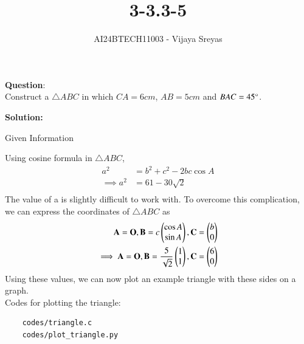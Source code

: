 \documentclass[journal]{IEEEtran}
\begin{document}

\vspace{3cm}

\title{3-3.3-5}
\author{AI24BTECH11003 - Vijaya Sreyas
}
{\let\newpage\relax\maketitle}

\renewcommand{\thefigure}{\theenumi}
\renewcommand{\thetable}{\theenumi}
\setlength{\intextsep}{10pt} %


\renewcommand{\thetable}{\theenumi}


\textbf{Question}:\\
Construct a $\triangle ABC$ in which $CA = 6cm$, $AB = 5cm$ and $BAC = 45\degree$.

\textbf{Solution: }

\begin{table}[h!]    
  \centering
  
  \caption{Given Information}
  \label{3-3.3-5-tab-0}
\end{table}

Using cosine formula in $\triangle ABC$, 
\begin{align}
	a^2 &= b^2 + c^2 - 2bc\cos A \\
	\implies a^2 &= 61 - 30\sqrt{2} \\
\end{align}
The value of a is slightly difficult to work with. To overcome this complication, we can express the coordinates of $\triangle ABC$ as
\begin{align}
        \mathbf{A} = \mathbf{O}, \mathbf{B} = c\begin{pmatrix}\cos A \\ \sin A\end{pmatrix}, \mathbf{C} = \begin{pmatrix}b \\ 0\end{pmatrix} \\
        \implies \mathbf{A} = \mathbf{O}, \mathbf{B} = \frac{5}{\sqrt{2}}\begin{pmatrix}1 \\ 1\end{pmatrix}, \mathbf{C} = \begin{pmatrix}6 \\ 0\end{pmatrix}
\end{align}
Using these values, we can now plot an example triangle with these sides on a graph.\\

Codes for plotting the triangle:
\begin{lstlisting}
	codes/triangle.c
	codes/plot_triangle.py
\end{lstlisting}
\end{document}
